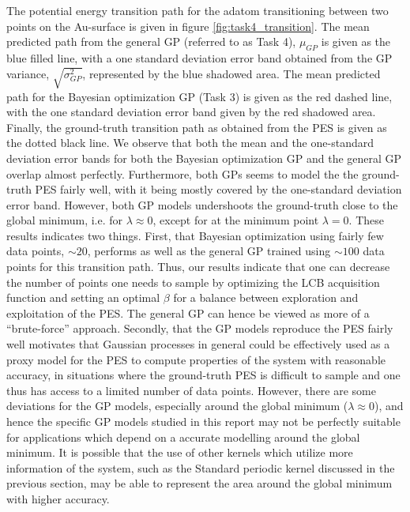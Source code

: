 \documentclass[11pt,a4paper]{article}
\begin{document}
The potential energy transition path for the adatom transitioning between two points on the Au-surface is given in figure \ref{fig:task4_transition}. The mean predicted path from the general GP (referred to as Task 4), $\mu_{GP}$ is given as the blue filled line, with a one standard deviation error band obtained from the GP variance, $\sqrt{\sigma^2_{GP}}$, represented by the blue shadowed area. The mean predicted path for the Bayesian optimization GP (Task 3) is given as the red dashed line, with the one standard deviation error band given by the red shadowed area. Finally, the ground-truth transition path as obtained from the PES is given as the dotted black line. We observe that both the mean and the one-standard deviation error bands for both the Bayesian optimization GP and the general GP overlap almost perfectly. Furthermore, both GPs seems to model the the ground-truth PES fairly well, with it being mostly covered by the one-standard deviation error band. However, both GP models undershoots the ground-truth close to the global minimum, i.e. for $\lambda\approx 0$, except for at the minimum point $\lambda = 0$. These results indicates two things. First,  that Bayesian optimization using fairly few data points, $\sim 20$, performs as well as the general GP trained using $\sim 100$ data points for this transition path. Thus, our results indicate that one can decrease the number of points one needs to sample by optimizing the LCB acquisition function and setting an optimal $\beta$ for a balance between exploration and exploitation of the PES. The general GP can hence be viewed as more of a ``brute-force'' approach. Secondly, that the GP models reproduce the PES fairly well motivates that Gaussian processes in general could be effectively used as a proxy model for the PES to compute properties of the system with reasonable accuracy, in situations where the ground-truth PES is difficult to sample and one thus has access to a limited number of data points. However, there are some deviations for the GP models, especially around the global minimum ($\lambda\approx 0$), and hence the specific GP models studied in this report may not be perfectly suitable for applications which depend on a accurate modelling around the global minimum. It is possible that the use of other kernels which utilize more information of the system, such as the Standard periodic kernel discussed in the previous section, may be able to represent the area around the global minimum with higher accuracy.




\newpage
\printbibliography
\end{document}
